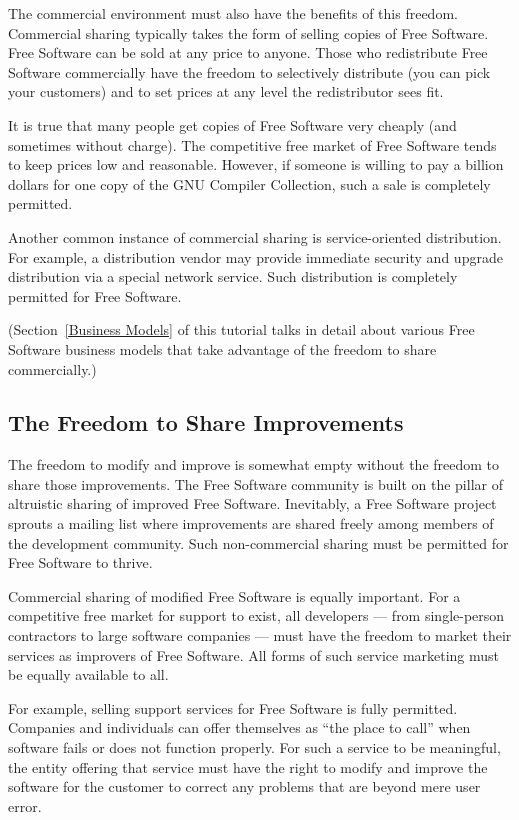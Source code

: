\documentclass[12pt]{report}
\begin{document}
The commercial environment must also have the benefits of this freedom.
Commercial sharing typically takes the form of selling copies of Free
Software.  Free Software can be sold at any price to anyone.  Those who
redistribute Free Software commercially have the freedom to selectively
distribute (you can pick your customers) and to set prices at any level
the redistributor sees fit.

It is true that many people get copies of Free Software very cheaply (and
sometimes without charge). The competitive free market of Free Software
tends to keep prices low and reasonable.  However, if someone is willing
to pay a billion dollars for one copy of the GNU Compiler Collection, such
a sale is completely permitted.

Another common instance of commercial sharing is service-oriented
distribution.  For example, a distribution vendor may provide immediate
security and upgrade distribution via a special network service.  Such
distribution is completely permitted for Free Software.

(Section~\ref{Business Models} of this tutorial talks in detail about
various Free Software business models that take advantage of the freedom
to share commercially.)

\subsection{The Freedom to Share Improvements}

The freedom to modify and improve is somewhat empty without the freedom to
share those improvements.  The Free Software community is built on the
pillar of altruistic sharing of improved Free Software.  Inevitably, a
Free Software project sprouts a mailing list where improvements are shared
freely among members of the development community.  Such non-commercial
sharing must be permitted for Free Software to thrive.

Commercial sharing of modified Free Software is equally important.  For a
competitive free market for support to exist, all developers --- from
single-person contractors to large software companies --- must have the
freedom to market their services as improvers of Free Software.  All forms
of such service marketing must be equally available to all.

For example, selling support services for Free Software is fully
permitted.  Companies and individuals can offer themselves as ``the place
to call'' when software fails or does not function properly.  For such a
service to be meaningful, the entity offering that service must have the
right to modify and improve the software for the customer to correct any
problems that are beyond mere user error.
\end{document}
